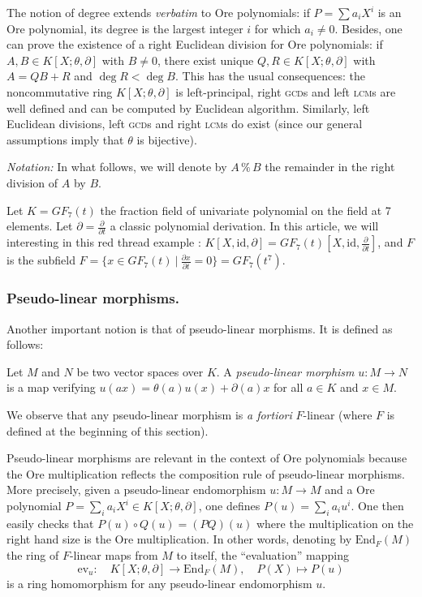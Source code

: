 \documentclass[a4paper]{llncs}
\newcommand{\id}{\textrm{id}}
\newcommand{\End}{\textrm{End}}
\newcommand{\ev}[1]{\textrm{ev}_{#1}}
\renewcommand{\mod}{\,\%\,}
\begin{document}
The notion of degree extends \emph{verbatim} to Ore polynomials: if $P = 
\sum a_iX^i$ is an Ore polynomial, its degree is the largest integer $i$ 
for which $a_i \neq 0$.
Besides, one can prove the existence of a right Euclidean division for 
Ore polynomials: if $A, B \in K[X;\theta,\partial]$ with $B \neq 0$, 
there exist unique $Q, R \in K[X;\theta,\partial]$ with $A = QB+R$ and 
$\deg R < \deg B$. This has the usual consequences: the noncommutative
ring $K[X;\theta,\partial]$ is left-principal, right \textsc{gcd}s and
left \textsc{lcm}s are well defined and can be computed by Euclidean
algorithm. 
Similarly, left Euclidean divisions, left \textsc{gcd}s and right 
\textsc{lcm}s do exist (since our general assumptions imply that
$\theta$ is bijective).

\medskip

\noindent
\textit{Notation:}
In what follows, we will denote by $A \mod B$ the remainder in the 
right division of $A$ by $B$.

\begin{example}
Let $K = GF_7(t)$ the fraction field of univariate polynomial on the field at 7 elements. Let $\partial = \frac{\partial}{\partial t}$ a classic polynomial derivation. In this article, we will interesting in this red thread example : $K[X, \id, \partial] = GF_7(t)[X, \id, \frac{\partial}{\partial t}]$, and $F$ is the subfield $F = \{x \in GF_7(t) \ | \ \frac{\partial x}{\partial t} = 0\} = GF_7(t^7)$.
\end{example}

\subsubsection*{Pseudo-linear morphisms.}

Another important notion is that of pseudo-linear morphisms. It is 
defined as follows:

\begin{definition}
Let $M$ and $N$ be two vector spaces over $K$.
A \emph{pseudo-linear morphism} $u : M\to N$ is a map verifying 
$u(ax) = \theta(a)u(x) + \partial(a)x$ for all $a \in K$ and $x \in M$.
\end{definition}

We observe that any pseudo-linear morphism is \emph{a fortiori}
$F$-linear (where $F$ is defined at the beginning of this section).

Pseudo-linear morphisms are relevant in the context of Ore polynomials 
because the Ore multiplication reflects the composition rule of 
pseudo-linear morphisms. More precisely, given a pseudo-linear 
endomorphism $u : M \to M$ and a Ore polynomial $P = \sum_i a_i X^i \in 
K[X;\theta,\partial]$, one defines $P(u) = \sum_i a_i u^i$. One then 
easily checks that $P(u) \circ Q(u) = (PQ)(u)$ where the multiplication 
on the right hand size is the Ore multiplication. In other words, 
denoting by $\End_F(M)$ the ring of $F$-linear maps from $M$ to itself, 
the ``evaluation'' mapping
$$\ev{u} : \quad K[X;\theta,\partial] \to \End_F(M), \quad
P(X) \mapsto P(u)$$
is a ring homomorphism for any pseudo-linear endomorphism $u$.
\end{document}
